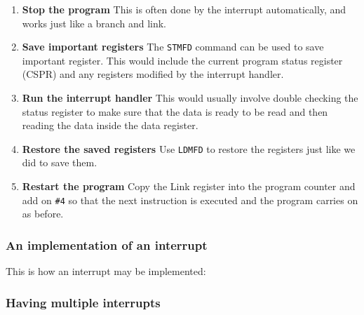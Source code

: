 \begin{enumerate}
	\item {\bf Stop the program}
			This is often done by the interrupt automatically, and works just
			like a branch and link.
	\item {\bf Save important registers}
			The {\tt STMFD} command can be used to save important register.
			This would include the current program status register (CSPR) and
			any registers modified by the interrupt handler.
	\item {\bf Run the interrupt handler}
			This would usually involve double checking the status register to
			make sure that the data is ready to be read and then reading the
			data inside the data register.
	\item {\bf Restore the saved registers}
			Use {\tt LDMFD} to restore the registers just like we did to save
			them.
	\item {\bf Restart the program}
			Copy the Link register into the program counter and add on {\tt \#4}
			so that the next instruction is executed and the program carries on
			as before.
\end{enumerate}

\subsubsection{An implementation of an interrupt}

This is how an interrupt may be implemented:


\subsubsection{Having multiple interrupts}

